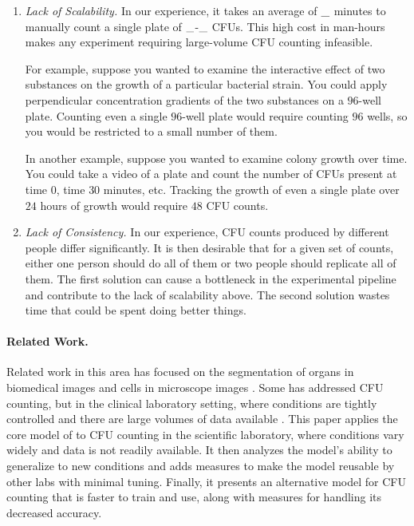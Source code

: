 \documentclass[10pt,letterpaper]{article}
\newcommand{\fillin}[1]{
    \IfEqCase{#1}{%
        {short}{\_}%
        {long}{\_\_\_\_\_}%
    }[\PackageError{fillin}{Undefined option to fillin: #1}{}]
}
\begin{document}
    \begin{enumerate}
        \item \textit{Lack of Scalability.}
            In our experience, it takes an average of $\fillin{short}$ minutes to manually count a single plate of $\fillin{short}$-$\fillin{short}$ CFUs. This high cost in man-hours makes any experiment requiring large-volume CFU counting infeasible.

            For example, suppose you wanted to examine the interactive effect of two substances on the growth of a particular bacterial strain. You could apply perpendicular concentration gradients of the two substances on a $96$-well plate. Counting even a single $96$-well plate would require counting $96$ wells, so you would be restricted to a small number of them.
    
            In another example, suppose you wanted to examine colony growth over time. You could take a video of a plate and count the number of CFUs present at time $0$, time $30$ minutes, etc. Tracking the growth of even a single plate over $24$ hours of growth would require $48$ CFU counts.
        
        \item \textit{Lack of Consistency.}
            In our experience, CFU counts produced by different people differ significantly. It is then desirable that for a given set of counts, either one person should do all of them or two people should replicate all of them. The first solution can cause a bottleneck in the experimental pipeline and contribute to the lack of scalability above. The second solution wastes time that could be spent doing better things.
    \end{enumerate}
    
    \paragraph*{Related Work.}
        Related work in this area has focused on the segmentation of organs in biomedical images \cite{Novikov, Ronneberger} and cells in microscope images \cite{Valen}. Some has addressed CFU counting, but in the clinical laboratory setting, where conditions are tightly controlled and there are large volumes of data available \cite{Ferrari}. This paper applies the core model of \cite{Valen} to CFU counting in the scientific laboratory, where conditions vary widely and data is not readily available. It then analyzes the model's ability to generalize to new conditions and adds measures to make the model reusable by other labs with minimal tuning. Finally, it presents an alternative model for CFU counting that is faster to train and use, along with measures for handling its decreased accuracy.
    
\end{document}
